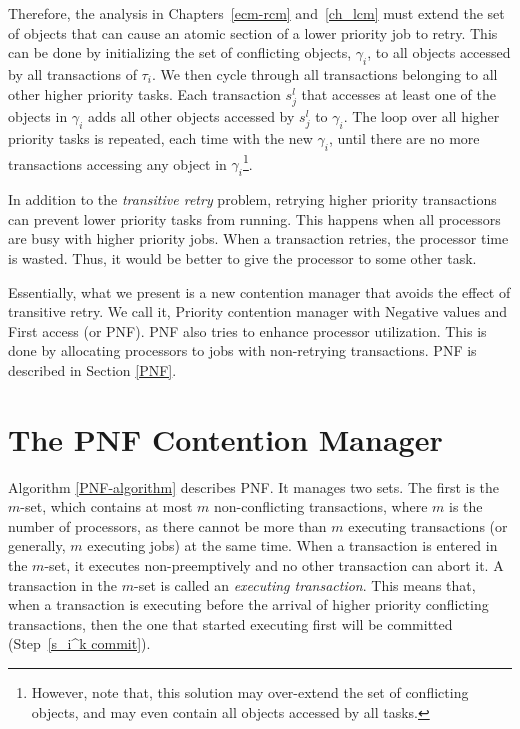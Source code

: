 Therefore, the analysis in Chapters~\ref{ecm-rcm} and~\ref{ch_lcm} must extend the set of objects that can cause an atomic section of a lower priority job to retry.  This can be done by initializing the set of conflicting objects, $\gamma_i$, to all objects accessed by all transactions of $\tau_i$. We then cycle through all transactions belonging to all other higher priority tasks. Each transaction $s_j^l$ that accesses at least one of the objects in $\gamma_i$ adds all other objects accessed by $s_j^l$ to $\gamma_i$. The loop over all higher priority tasks is repeated, each time with the new $\gamma_i$, until there are no more transactions accessing any object in $\gamma_i$\footnote{However, note that, this solution may over-extend the set of conflicting objects, and may even contain all objects accessed by all tasks.}.

In addition to the \emph{transitive retry} problem, retrying higher priority transactions can prevent lower priority tasks from running. This happens when all processors are busy with higher priority jobs. When a transaction retries, the processor time is wasted. Thus, it would be better to give the processor to some other task.


Essentially, what we present is a new contention manager that avoids the effect of transitive retry. We call it, Priority contention manager with Negative values and First access (or PNF). PNF also tries to enhance processor utilization. This is done by allocating processors to jobs with non-retrying transactions. PNF is described in Section \ref{PNF}.

\section{The PNF Contention Manager\label{PNF}}

Algorithm \ref{PNF-algorithm} describes PNF. It
manages two sets. The first is the $m$-set, which contains at most $m$ non-conflicting
transactions, where $m$ is the number of processors, as
there cannot be more than $m$ executing transactions (or generally,
$m$ executing jobs) at the same time. When a transaction is entered
in the $m$-set, it executes non-preemptively and no other transaction
can abort it. A transaction in the $m$-set is called an \emph{executing
transaction}. 
This means that, when a transaction is executing before
the arrival of higher priority conflicting transactions, then the
one that started executing first will be committed (Step~\ref{s_i^k commit}). 


